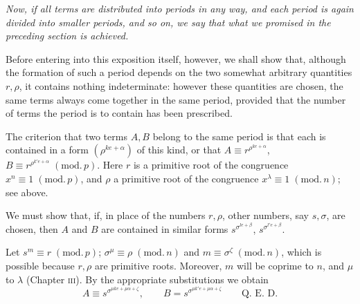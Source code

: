 \emph{Now, if all terms are distributed into periods in any way, and each period is again divided into smaller periods, and so on, we say that what we promised in the preceding section is achieved.}

Before entering into this exposition itself, however, we shall show that, although the formation of such a period depends on the two somewhat arbitrary quantities $r,\rho$, it contains nothing indeterminate: however these quantities are chosen, the same terms always come together in the same period, provided that the number of terms the period is to contain has been prescribed.

The criterion that two terms $A,B$ belong to the same period is that each is contained in a form $(\rho^{ke+\alpha})$ of this kind, or that $A\equiv r^{\rho^{ke+\alpha}}$, $B\equiv r^{\rho^{k'e+\alpha}}\;(\mathrm{mod.}\,p)$. Here $r$ is a primitive root of the congruence $x^n\equiv1\;(\mathrm{mod.}\,p)$, and $\rho$ a primitive root of the congruence $x^\lambda\equiv1\;(\mathrm{mod.}\,n)$; see above.

We must show that, if, in place of the numbers $r,\rho$, other numbers, say $s,\sigma$, are chosen, then $A$ and $B$ are contained in similar forms $s^{\sigma^{le+\beta}}$, $s^{\sigma^{l'e+\beta}}$.

Let $s^m\equiv r\;(\mathrm{mod.}\,p)$; $\sigma^\mu\equiv\rho\;(\mathrm{mod.}\,n)$ and $m\equiv\sigma^\zeta\;(\mathrm{mod.}\,n)$, which is possible because $r,\rho$ are primitive roots. Moreover, $m$ will be coprime to $n$, and $\mu$ to $\lambda$ (Chapter \textsc{iii}). By the appropriate substitutions we obtain
\[
A\equiv s^{\sigma^{\mu ke+\mu\alpha+\zeta}},\qquad B=s^{\sigma^{\mu k'e+\mu\alpha+\zeta}}\qquad\text{Q. E. D.}
\]
